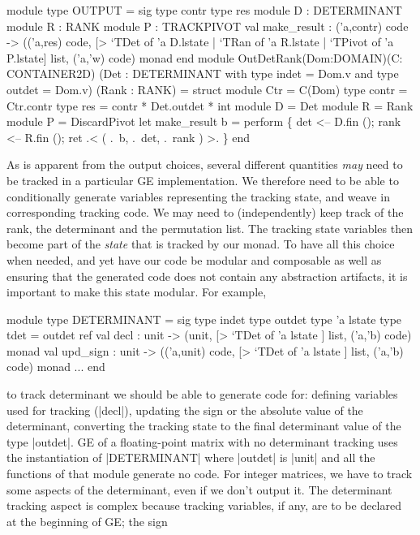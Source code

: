 \documentclass[draft]{elsart}
\begin{document}
\begin{code2}
module type OUTPUT = sig
  type contr  type res
  module D : DETERMINANT   module R : RANK   module P : TRACKPIVOT
  val make_result : ('a,contr) code -> 
    (('a,res) code,
     [> `TDet of 'a D.lstate | `TRan of 'a R.lstate | `TPivot of 'a P.lstate]
       list, ('a,'w) code) monad
end
module OutDetRank(Dom:DOMAIN)(C: CONTAINER2D)
    (Det : DETERMINANT with type indet = Dom.v and type outdet = Dom.v)
    (Rank : RANK) = struct
  module Ctr = C(Dom)
  type contr = Ctr.contr
  type res = contr * Det.outdet * int
  module D = Det   module R = Rank   module P = DiscardPivot
  let make_result b = perform \{ det  <-- D.fin ();  rank <-- R.fin ();
    ret .< ( .~b, .~det, .~rank ) >. \}
end
\end{code2}

As is apparent from the output choices, several different quantities
\emph{may} need to be tracked in a particular GE implementation.  We
therefore need to be able to conditionally generate variables
representing the tracking state, and weave in corresponding tracking
code. We may need to (independently) keep track of the rank, the
determinant and the permutation list.  The tracking state variables
then become part of the \emph{state} that is tracked by our monad.  To
have all this choice when needed, and yet have our code be modular and
composable as well as ensuring that the generated code does not
contain any abstraction artifacts, it is important to make this state
modular.  For example,
\begin{code}
module type DETERMINANT = sig
  type indet  type outdet  type 'a lstate
  type tdet = outdet ref   
  val decl : unit -> 
    (unit, [> `TDet of 'a lstate ] list, ('a,'b) code) monad
  val upd_sign : unit -> 
    (('a,unit) code, [> `TDet of 'a lstate ] list, ('a,'b) code) monad
  ...
end
\end{code}
\noindent  to track determinant we should be able to generate code
for: defining variables used for tracking (|decl|),
updating the sign or the absolute
value of the determinant, converting the tracking state
to the final determinant value of the type |outdet|. GE of a
floating-point matrix with no determinant tracking uses the
instantiation of |DETERMINANT| where |outdet| is |unit| and all the
functions of that module generate no code. For integer matrices, we
have to track some aspects of the determinant, even if we don't output
it. The determinant tracking aspect is complex because tracking
variables, if any, are to be declared at the beginning of GE; the sign
\end{document}
